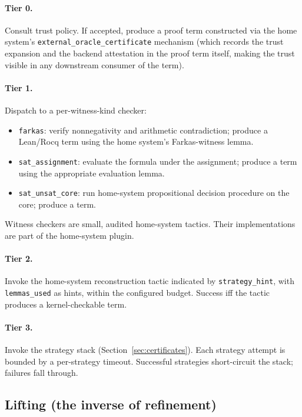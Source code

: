 \documentclass[11pt,letterpaper]{article}
\theoremstyle{definition}
\theoremstyle{remark}
\begin{document}
\paragraph{Tier 0.} Consult trust policy. If accepted, produce a
proof term constructed via the home system's
\texttt{external\_oracle\_certificate} mechanism (which records the
trust expansion and the backend attestation in the proof term itself,
making the trust visible in any downstream consumer of the term).

\paragraph{Tier 1.} Dispatch to a per-witness-kind checker:

\begin{itemize}[leftmargin=2em]
  \item \texttt{farkas}: verify nonnegativity and arithmetic
        contradiction; produce a Lean/Rocq term using the home system's
        Farkas-witness lemma.
  \item \texttt{sat\_assignment}: evaluate the formula under the
        assignment; produce a term using the appropriate evaluation
        lemma.
  \item \texttt{sat\_unsat\_core}: run home-system propositional
        decision procedure on the core; produce a term.
\end{itemize}

Witness checkers are small, audited home-system tactics. Their
implementations are part of the home-system plugin.

\paragraph{Tier 2.} Invoke the home-system reconstruction tactic
indicated by \texttt{strategy\_hint}, with \texttt{lemmas\_used} as
hints, within the configured budget. Success iff the tactic produces
a kernel-checkable term.

\paragraph{Tier 3.} Invoke the strategy stack
(Section~\ref{sec:certificates}). Each strategy attempt is bounded by
a per-strategy timeout. Successful strategies short-circuit the stack;
failures fall through.

\subsection{Lifting (the inverse of refinement)}
\label{sec:lifting}
\end{document}
